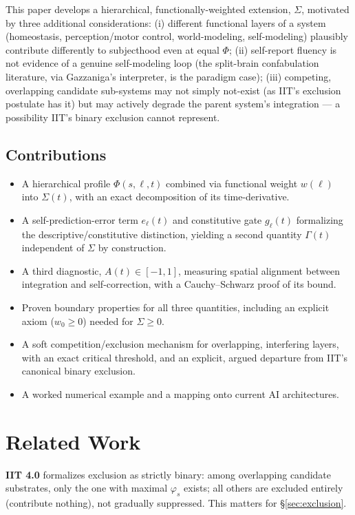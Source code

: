 \documentclass[11pt]{article}
\begin{document}
This paper develops a hierarchical, functionally-weighted extension, $\Sigma$, motivated by three additional considerations: (i) different functional layers of a system (homeostasis, perception/motor control, world-modeling, self-modeling) plausibly contribute differently to subjecthood even at equal $\Phi$; (ii) self-report fluency is not evidence of a genuine self-modeling loop (the split-brain confabulation literature, via Gazzaniga's interpreter, is the paradigm case); (iii) competing, overlapping candidate sub-systems may not simply not-exist (as IIT's exclusion postulate has it) but may actively degrade the parent system's integration --- a possibility IIT's binary exclusion cannot represent.

\subsection*{Contributions}
\begin{itemize}[leftmargin=*]
\item A hierarchical profile $\Phi(s,\ell,t)$ combined via functional weight $w(\ell)$ into $\Sigma(t)$, with an exact decomposition of its time-derivative.
\item A self-prediction-error term $e_\ell(t)$ and constitutive gate $g_\ell(t)$ formalizing the descriptive/constitutive distinction, yielding a second quantity $\Gamma(t)$ independent of $\Sigma$ by construction.
\item A third diagnostic, $A(t)\in[-1,1]$, measuring spatial alignment between integration and self-correction, with a Cauchy--Schwarz proof of its bound.
\item Proven boundary properties for all three quantities, including an explicit axiom ($w_0\ge 0$) needed for $\Sigma\ge 0$.
\item A soft competition/exclusion mechanism for overlapping, interfering layers, with an exact critical threshold, and an explicit, argued departure from IIT's canonical binary exclusion.
\item A worked numerical example and a mapping onto current AI architectures.
\end{itemize}

\section{Related Work}

\textbf{IIT 4.0} \cite{albantakis2023} formalizes exclusion as strictly binary: among overlapping candidate substrates, only the one with maximal $\varphi_s$ exists; all others are excluded entirely (contribute nothing), not gradually suppressed. This matters for \S\ref{sec:exclusion}.
\end{document}
